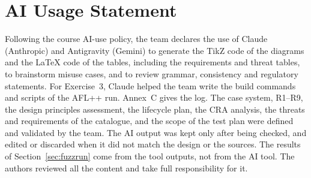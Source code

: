\section{AI Usage Statement}
\label{sec:ai}

Following the course AI-use policy, the team declares the use of
Claude (Anthropic) and Antigravity (Gemini) to generate the TikZ code of
the diagrams and the \LaTeX{} code of the tables, including the
requirements and threat tables, to brainstorm misuse cases, and to
review grammar, consistency and regulatory statements. For Exercise~3,
Claude helped the team write the build commands and scripts of the AFL++ run. 
Annex~C gives the log. The case system, \mbox{R1--R9}, the design principles assessment,
the lifecycle plan, the \ac{CRA} analysis, the threats and requirements
of the catalogue, and the scope of the test plan were defined and
validated by the team. The AI output was kept only after being checked,
and edited or discarded when it did not match the design or the
sources. The results of Section~\ref{sec:fuzzrun} come from the tool
outputs, not from the AI tool. The authors reviewed all the content and
take full responsibility for it.
